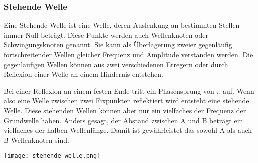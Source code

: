 \documentclass[../document.tex]{subfiles}
\begin{document}
\subsubsection{Stehende Welle}

Eine Stehende Welle ist eine Welle, deren Auslenkung an bestimmten Stellen immer Null beträgt. Diese Punkte werden auch Wellenknoten oder Schwingungsknoten genannt. Sie kann als Überlagerung zweier gegenläufig fortschreitender Wellen gleicher Frequenz und Amplitude verstanden werden. Die gegenläufigen Wellen können aus zwei verschiedenen Erregern oder durch Reflexion einer Welle an einem Hindernis entstehen. 

Bei einer Reflexion an einem festen Ende tritt ein Phasensprung von $\pi$ auf. Wenn also eine Welle zwischen zwei Fixpunkten reflektiert wird entsteht eine stehende Welle. Diese stehenden Wellen können aber nur ein vielfaches der Frequenz der Grundwelle haben. Anders gesagt, der Abstand zwischen A und B beträgt ein vielfaches der halben Wellenlänge. Damit ist gewährleistet das sowohl A als auch B Wellenknoten sind.

\texttt{[image: stehende\_welle.png]} %
\end{document}
